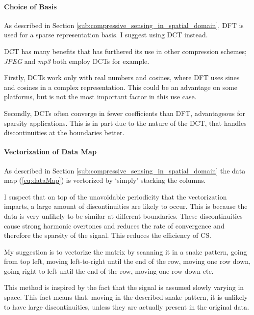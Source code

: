 \documentclass[Main]{subfiles}
\begin{document}
			\paragraph{Choice of Basis} %
			\label{par:choice_of_basis}
			
				As described in Section \ref{sub:compressive_sensing_in_spatial_domain}, DFT is used for a sparse representation basis.
				I suggest using DCT instead.

				DCT has many benefits that has furthered its use in other compression schemes; \emph{JPEG} and \emph{mp3} both employ DCTs for example.

				Firstly, DCTs work only with real numbers and cosines, where DFT uses sines and cosines in a complex representation. This could be an advantage on some platforms, but is not the most important factor in this use case.

				Secondly, DCTs often converge in fewer coefficients than DFT, advantageous for sparsity applications.
				This is in part due to the nature of the DCT, that handles discontinuities at the boundaries better.


			
			\paragraph{Vectorization of Data Map} %
			\label{par:vectorization_of_data_map}

				As described in Section \ref{sub:compressive_sensing_in_spatial_domain} the data map (\ref{eq:dataMap}) is vectorized by `simply' stacking the columns.

				I suspect that on top of the unavoidable periodicity that the vectorization imparts, a large amount of discontinuities are likely to occur.
				This is because the data is very unlikely to be similar at different boundaries.
				These discontinuities cause strong harmonic overtones and reduces the rate of convergence and therefore the sparsity of the signal.
				This reduces the efficiency of CS.

				My suggestion is to vectorize the matrix by scanning it in a snake pattern, going from top left, moving left-to-right until the end of the row, moving one row down, going right-to-left until the end of the row, moving one row down etc.

				This method is inspired by the fact that the signal is assumed slowly varying in space.
				This fact means that, moving in the described snake pattern, it is unlikely to have large discontinuities, unless they are actually present in the original data.

		


\end{document}

